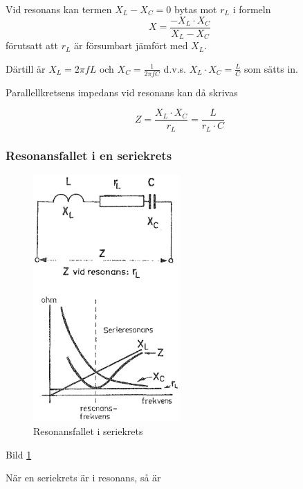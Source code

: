 Vid resonans kan termen \(X_L - X_C = 0\) bytas mot \(r_L\) i formeln
\[X = \frac{-X_L \cdot X_C}{X_L - X_C}\] förutsatt att \(r_L\) är försumbart
jämfört med \(X_L\).

Därtill är \(X_L = 2πfL\) och \(X_C = \frac{1}{2πfC}\) d.v.s.
\(X_L \cdot X_C = \frac{L}{C}\) som sätts in.

Parallellkretsens impedans vid resonans kan då skrivas

\[
Z = \frac{X_L \cdot X_C}{r_L} = \frac{L}{r_L \cdot C}
\]

\subsubsection{Resonansfallet i en seriekrets}
\label{serieresonans}

\begin{figure}[h]
\begin{center}
  \includegraphics[width=0.5\textwidth]{images/cropped_pdfs/bild_2_3-19.pdf}
  \caption{Resonansfallet i seriekrets}
  \label{fig:BildII3-19}
\end{center}
\end{figure}

Bild \ref{fig:BildII3-19}

När en seriekrets är i resonans, så är

